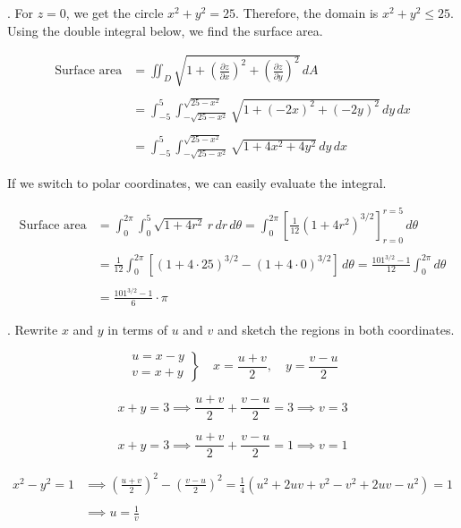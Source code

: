 \documentclass{article}
\begin{document}
\newpage

. For $z=0$, we get the circle $x^2+y^2=25$. Therefore, the domain is $x^2+y^2\leq25$. Using the double integral below, we find the surface area.

\begin{align*}
\text{Surface area}&=\iint_D\sqrt{1+\left(\frac{\partial z}{\partial x}\right)^2 +\left(\frac{\partial z}{\partial y}\right)^2}\,dA\\\\&=\int_{-5}^5\int_{-\sqrt{25-x^2}}^{\sqrt{25-x^2}}\sqrt{1+\left(-2x\right)^2 +\left(-2y\right)^2}\,dy\,dx\\\\&=\int_{-5}^5\int_{-\sqrt{25-x^2}}^{\sqrt{25-x^2}}\sqrt{1+4x^2+4y^2}\,dy\,dx
\end{align*}

\hfill

\noindent If we switch to polar coordinates, we can easily evaluate the integral.

\begin{align*}\text{Surface area}&=\int_0^{2\pi}\int_0^5\sqrt{1+4r^2}\,r\,dr\,d\theta=\int_0^{2\pi}\left[\frac1{12}\left(1+4r^2\right)^{3/2}\right]_{r=0}^{r=5}\,d\theta\\\\&=\frac1{12}\int_0^{2\pi}\left[\left(1+4\cdot25\right)^{3/2}-\left(1+4\cdot0\right)^{3/2}\right]\,d\theta=\frac{101^{3/2}-1}{12}\int_0^{2\pi}d\theta\\\\&=\boxed{\frac{101^{3/2}-1}6\cdot\pi}\end{align*}

\hfill

. Rewrite $x$ and $y$ in terms of $u$ and $v$ and sketch the regions in both coordinates.

\[
\left.
\begin{array}{c}
u=x-y\\v=x+y
\end{array}\right\}
\quad \displaystyle x=\frac{u+v}2,\quad y=\frac{v-u}2
\]

\[x+y=3\implies\frac{u+v}2+\frac{v-u}2=3\implies v=3\]

\[x+y=3\implies\frac{u+v}2+\frac{v-u}2=1\implies v=1\]

\begin{align*}x^2-y^2=1&\implies\left(\frac{u+v}2\right)^2-\left(\frac{v-u}2\right)^2=\frac14\left(u^2+2uv+v^2-v^2+2uv-u^2\right)=1\\\\&\implies u=\frac1v\end{align*}
\end{document}
